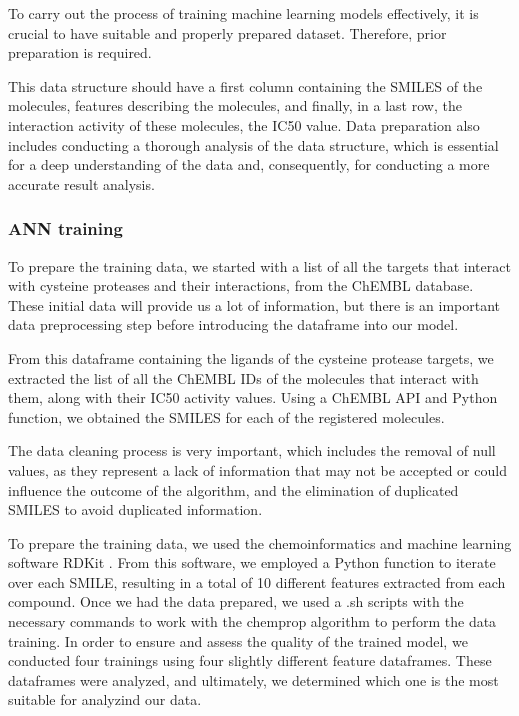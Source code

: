 \documentclass[final,times,twocolumn,article]{elsarticle}
\begin{document}
To carry out the process of training machine learning models effectively, it is crucial to have suitable and properly prepared dataset. Therefore, prior preparation is required. 

This data structure should have a first column containing the SMILES of the molecules, features describing the molecules, and finally, in a last row, the interaction activity of these molecules, the IC50 value. Data preparation also includes conducting a thorough analysis of the data structure, which is essential for a deep understanding of the data and, consequently, for conducting a more accurate result analysis. 

\subsubsection{ANN training}

To prepare the training data, we started with a list of all the targets that interact with cysteine proteases and their interactions, from the ChEMBL database. These initial data will provide us a lot of information, but there is an important data preprocessing step before introducing the dataframe into our model. 

From this dataframe containing the ligands of the cysteine protease targets, we extracted the list of all the ChEMBL IDs of the molecules that interact with them, along with their IC50 activity values. Using a ChEMBL API and Python function, we obtained the SMILES for each of the registered molecules. 

The data cleaning process is very important, which includes the removal of null values, as they represent a lack of information that may not be accepted or could influence the outcome of the algorithm, and the elimination of duplicated SMILES to avoid duplicated information. 

To prepare the training data, we used the chemoinformatics and machine learning software RDKit \cite{rdkitweb}. From this software, we employed a Python function to iterate over each SMILE, resulting in a total of 10 different features extracted from each compound. Once we had the data prepared, we used a .sh scripts with the necessary commands to work with the chemprop algorithm to perform the data training. 
In order to ensure and assess the quality of the trained model, we conducted four trainings using four slightly different feature dataframes. These dataframes were analyzed, and ultimately, we determined which one is the most suitable for analyzind our data. 
\end{document}
